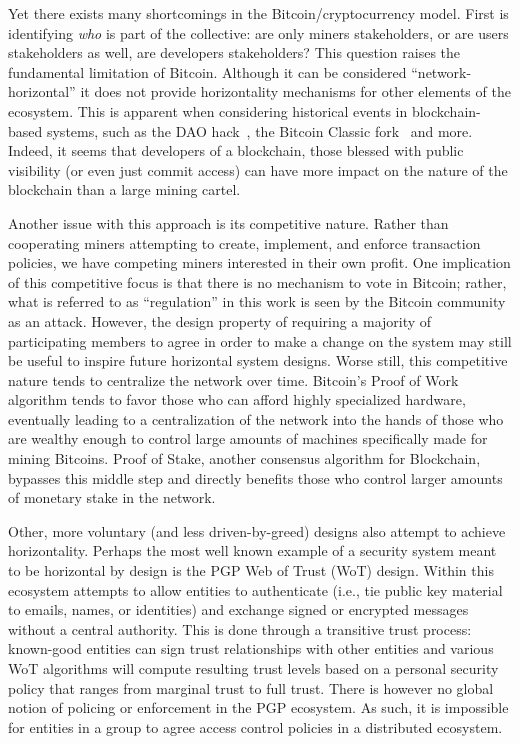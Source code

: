 Yet there exists many shortcomings in the Bitcoin/cryptocurrency model. First
is identifying \emph{who} is part of the collective: are only miners
stakeholders, or are users stakeholders as well, are developers stakeholders?
This question raises the fundamental limitation of Bitcoin. Although it can be
considered ``network-horizontal'' it does not provide  horizontality mechanisms
for other elements of the ecosystem. This is apparent when considering
historical events in blockchain-based systems, such as the DAO hack~\cite{},
the Bitcoin Classic fork~\cite{} and more. Indeed, it seems that developers of
a blockchain, those blessed with public visibility (or even just commit access)
can have more impact on the nature of the blockchain than a large mining
cartel.

Another issue with this approach is its competitive nature. Rather than
cooperating miners attempting to create, implement, and enforce transaction
policies, we have competing miners interested in their own profit. One
implication of this competitive focus is that there is no mechanism to vote in
Bitcoin; rather, what is referred to as ``regulation'' in this work is seen by
the Bitcoin community as an attack. However, the design property of requiring
a majority of participating members to agree in order to make a change on the system
may still be useful to inspire future horizontal system designs. Worse still,
this competitive nature tends to centralize the network over time. Bitcoin's
Proof of Work algorithm tends to favor those who can afford highly specialized
hardware, eventually leading to a centralization of the network into the hands
of those who are wealthy enough to control large amounts of machines
specifically made for mining Bitcoins. Proof of Stake, another consensus
algorithm for Blockchain, bypasses this middle step and directly benefits those
who control larger amounts of monetary stake in the network.


Other, more voluntary (and less driven-by-greed) designs also attempt to
achieve horizontality. Perhaps the most well known example of a security system
meant to be horizontal by design is the PGP Web of Trust (WoT) design. Within this ecosystem
attempts to allow entities to authenticate (i.e., tie public key material to
emails, names, or identities) and exchange signed or encrypted messages without
a central authority. This is done through a transitive trust process:
known-good entities can sign trust relationships with other entities and
various WoT algorithms will compute resulting trust levels based on a personal
security policy that ranges from marginal trust to full trust. There is however
no global notion of policing or enforcement in the PGP ecosystem. As such, it
is impossible for entities in a group to agree access control policies in a
distributed ecosystem.

